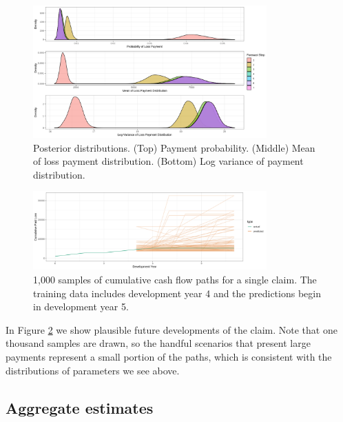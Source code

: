 \documentclass{article}
\begin{document}
\begin{figure}
  \begin{center}
    \includegraphics[width=0.8\textwidth]{images/posteriors.png}
  \end{center}
  \caption{Posterior distributions. (Top) Payment probability. (Middle) Mean of loss payment distribution. (Bottom) Log variance of payment distribution.}
  \label{fig:prob_cash_flows}
\end{figure}

\begin{figure}
  \begin{center}
    \includegraphics[width=0.8\textwidth]{images/claim_paths.png}
  \end{center}
  \caption{1,000 samples of cumulative cash flow paths for a single claim. The training data includes development year 4 and the predictions begin in development year 5.}
  \label{fig:claim_paths}
\end{figure}

In Figure \ref{fig:claim_paths} we show plausible future developments of the claim. Note that one thousand samples are drawn, so the handful scenarios that present large payments represent a small portion of the paths, which is consistent with the distributions of parameters we see above.

\subsection{Aggregate estimates}
\end{document}
